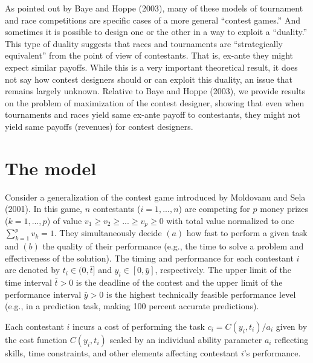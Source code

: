 \documentclass[11pt, titlepage]{article}
\newcommand\deadline{\bar{t}}
\begin{document}
As pointed out by Baye and Hoppe (2003), many of these models of
tournament and race competitions are specific cases of a more general
``contest games.'' And sometimes it is possible to design one or the
other in a way to exploit a ``duality.'' This type of duality suggests
that races and tournaments are ``strategically equivalent'' from the
point of view of contestants. That is, ex-ante they might expect similar
payoffs. While this is a very important theoretical result, it does not
say how contest designers should or can exploit this duality, an issue
that remains largely unknown. Relative to Baye and Hoppe (2003), we
provide results on the problem of maximization of the contest designer,
showing that even when tournaments and races yield same ex-ante payoff
to contestants, they might not yield same payoffs (revenues) for contest
designers.

\newcommand\reserve{\text{res}}
\newcommand\competition{c}
\newcommand\ability{a}
\newcommand\performance{y}
\newcommand\timing{t}
\newcommand\Timing{T}
\newcommand\Performance{Y}
\newcommand\marginal{\underline{a}}


\section{The model}\label{the-model}

Consider a generalization of the contest game introduced by Moldovanu
and Sela (2001). In this game, \(n\) contestants (\(i=1,..., n\)) are
competing for \(p\) money prizes (\(k=1,...,p\)) of value
\(v_1\geq v_2\geq ...\geq v_p\geq0\) with total value normalized to one
\(\sum_{k=1}^p v_k =1\). They simultaneously decide \((a)\) how fast to
perform a given task and \((b)\) the quality of their performance (e.g.,
the time to solve a problem and effectiveness of the solution). The
timing and performance for each contestant \(i\) are denoted by
\(\timing_i\in(0,\deadline]\) and \(\performance_i\in[0,\bar y]\),
respectively. The upper limit of the time interval \(\deadline>0\) is
the deadline of the contest and the upper limit of the performance
interval \(\bar y>0\) is the highest technically feasible performance
level (e.g., in a prediction task, making 100 percent accurate
predictions).

Each contestant \(i\) incurs a cost of performing the task
\(c_i = C(\performance_i, \timing_i) / \ability_i\) given by the cost
function \(C(\performance_i, \timing_i)\) scaled by an individual
ability parameter \(a_i\) reflecting skills, time constraints, and other
elements affecting contestant \(i\)'s performance.
\end{document}
